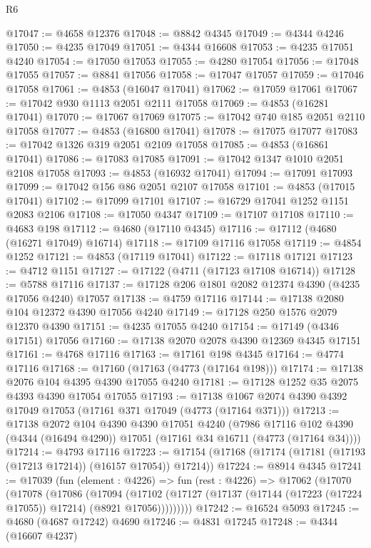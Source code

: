 \begin{lexlean}{R6}
\begin{coremodule}
@17047 := @4658 @12376
@17048 := @8842 @4345
@17049 := @4344 @4246
@17050 := @4235 @17049
@17051 := @4344 @16608
@17053 := @4235 @17051 @4240
@17054 := @17050 @17053
@17055 := @4280 @17054
@17056 := @17048 @17055
@17057 := @8841 @17056
@17058 := @17047 @17057
@17059 := @17046 @17058
@17061 := @4853 (@16047 @17041)
@17062 := @17059 @17061
@17067 := @17042 @930 @1113 @2051 @2111 @17058
@17069 := @4853 (@16281 @17041)
@17070 := @17067 @17069
@17075 := @17042 @740 @185 @2051 @2110 @17058
@17077 := @4853 (@16800 @17041)
@17078 := @17075 @17077
@17083 := @17042 @1326 @319 @2051 @2109 @17058
@17085 := @4853 (@16861 @17041)
@17086 := @17083 @17085
@17091 := @17042 @1347 @1010 @2051 @2108 @17058
@17093 := @4853 (@16932 @17041)
@17094 := @17091 @17093
@17099 := @17042 @156 @86 @2051 @2107 @17058
@17101 := @4853 (@17015 @17041)
@17102 := @17099 @17101
@17107 := @16729 @17041 @1252 @1151 @2083 @2106
@17108 := @17050 @4347
@17109 := @17107 @17108
@17110 := @4683 @198
@17112 := @4680 (@17110 @4345)
@17116 := @17112 (@4680 (@16271 @17049) @16714)
@17118 := @17109 @17116 @17058
@17119 := @4854 @1252
@17121 := @4853 (@17119 @17041)
@17122 := @17118 @17121
@17123 := @4712 @1151
@17127 := @17122 (@4711 (@17123 @17108 @16714))
@17128 := @5788 @17116
@17137 := @17128 @206 @1801 @2082 @12374 @4390 (@4235 @17056 @4240) @17057
@17138 := @4759 @17116
@17144 := @17138 @2080 @104 @12372 @4390 @17056 @4240
@17149 := @17128 @250 @1576 @2079 @12370 @4390
@17151 := @4235 @17055 @4240
@17154 := @17149 (@4346 @17151) @17056
@17160 := @17138 @2070 @2078 @4390 @12369 @4345 @17151
@17161 := @4768 @17116
@17163 := @17161 @198 @4345
@17164 := @4774 @17116
@17168 := @17160 (@17163 (@4773 (@17164 @198)))
@17174 := @17138 @2076 @104 @4395 @4390 @17055 @4240
@17181 := @17128 @1252 @35 @2075 @4393 @4390 @17054 @17055
@17193 := @17138 @1067 @2074 @4390 @4392 @17049 @17053 (@17161 @371 @17049 (@4773 (@17164 @371)))
@17213 := @17138
    @2072
    @104
    @4390
    @4390
    @17051
    @4240
    (@7986 @17116 @102 @4390 (@4344 (@16494 @4290)) @17051 (@17161 @34 @16711 (@4773 (@17164 @34))))
@17214 := @4793 @17116
@17223 := @17154 (@17168 (@17174 (@17181 (@17193 (@17213 @17214)) (@16157 @17054)) @17214))
@17224 := @8914 @4345
@17241 := @17039
    (fun (element : @4226) =>
    fun (rest : @4226) =>
    @17062
      (@17070
        (@17078
          (@17086
            (@17094
              (@17102
                (@17127 (@17137 (@17144 (@17223 (@17224 @17055)) @17214) (@8921 @17056)))))))))
@17242 := @16524 @5093
@17245 := @4680 (@4687 @17242) @4690
@17246 := @4831 @17245
@17248 := @4344 (@16607 @4237)

\end{coremodule}
\end{lexlean}
